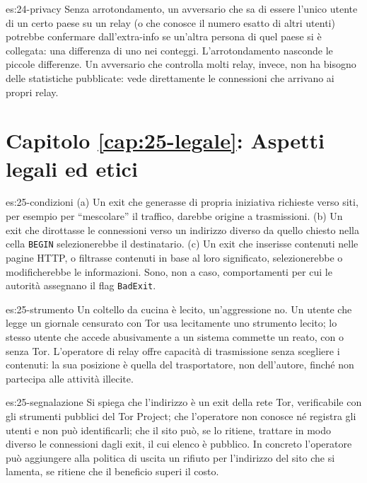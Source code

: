 \begin{soluzione}{es:24-privacy}
Senza arrotondamento, un avversario che sa di essere l'unico utente di un certo paese su un relay (o che conosce il numero esatto di altri utenti) potrebbe confermare dall'extra-info se un'altra persona di quel paese si è collegata: una differenza di uno nei conteggi. L'arrotondamento nasconde le piccole differenze. Un avversario che controlla molti relay, invece, non ha bisogno delle statistiche pubblicate: vede direttamente le connessioni che arrivano ai propri relay.
\end{soluzione}

\section*{Capitolo \ref{cap:25-legale}: Aspetti legali ed etici}

\begin{soluzione}{es:25-condizioni}
(a) Un exit che generasse di propria iniziativa richieste verso siti, per esempio per \enquote{mescolare} il traffico, darebbe origine a trasmissioni. (b) Un exit che dirottasse le connessioni verso un indirizzo diverso da quello chiesto nella cella \texttt{BEGIN} selezionerebbe il destinatario. (c) Un exit che inserisse contenuti nelle pagine HTTP, o filtrasse contenuti in base al loro significato, selezionerebbe o modificherebbe le informazioni. Sono, non a caso, comportamenti per cui le autorità assegnano il flag \texttt{BadExit}.
\end{soluzione}

\begin{soluzione}{es:25-strumento}
Un coltello da cucina è lecito, un'aggressione no. Un utente che legge un giornale censurato con Tor usa lecitamente uno strumento lecito; lo stesso utente che accede abusivamente a un sistema commette un reato, con o senza Tor. L'operatore di relay offre capacità di trasmissione senza scegliere i contenuti: la sua posizione è quella del trasportatore, non dell'autore, finché non partecipa alle attività illecite.
\end{soluzione}

\begin{soluzione}{es:25-segnalazione}
Si spiega che l'indirizzo è un exit della rete Tor, verificabile con gli strumenti pubblici del Tor Project; che l'operatore non conosce né registra gli utenti e non può identificarli; che il sito può, se lo ritiene, trattare in modo diverso le connessioni dagli exit, il cui elenco è pubblico. In concreto l'operatore può aggiungere alla politica di uscita un rifiuto per l'indirizzo del sito che si lamenta, se ritiene che il beneficio superi il costo.
\end{soluzione}

